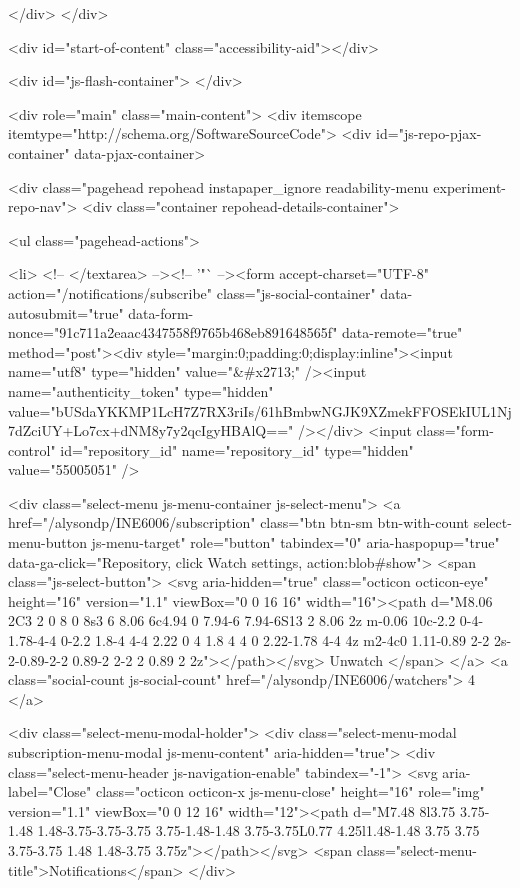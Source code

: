     
  </div>
</div>


      


    <div id="start-of-content" class="accessibility-aid"></div>

      <div id="js-flash-container">
</div>


    <div role="main" class="main-content">
        <div itemscope itemtype="http://schema.org/SoftwareSourceCode">
    <div id="js-repo-pjax-container" data-pjax-container>
      
<div class="pagehead repohead instapaper_ignore readability-menu experiment-repo-nav">
  <div class="container repohead-details-container">

    

<ul class="pagehead-actions">

  <li>
        <!-- </textarea> --><!-- '"` --><form accept-charset="UTF-8" action="/notifications/subscribe" class="js-social-container" data-autosubmit="true" data-form-nonce="91c711a2eaac4347558f9765b468eb891648565f" data-remote="true" method="post"><div style="margin:0;padding:0;display:inline"><input name="utf8" type="hidden" value="&#x2713;" /><input name="authenticity_token" type="hidden" value="bUSdaYKKMP1LcH7Z7RX3riIs/61hBmbwNGJK9XZmekFFOSEkIUL1Nj7dZciUY+Lo7cx+dNM8y7y2qcIgyHBAlQ==" /></div>      <input class="form-control" id="repository_id" name="repository_id" type="hidden" value="55005051" />

        <div class="select-menu js-menu-container js-select-menu">
          <a href="/alysondp/INE6006/subscription"
            class="btn btn-sm btn-with-count select-menu-button js-menu-target" role="button" tabindex="0" aria-haspopup="true"
            data-ga-click="Repository, click Watch settings, action:blob#show">
            <span class="js-select-button">
              <svg aria-hidden="true" class="octicon octicon-eye" height="16" version="1.1" viewBox="0 0 16 16" width="16"><path d="M8.06 2C3 2 0 8 0 8s3 6 8.06 6c4.94 0 7.94-6 7.94-6S13 2 8.06 2z m-0.06 10c-2.2 0-4-1.78-4-4 0-2.2 1.8-4 4-4 2.22 0 4 1.8 4 4 0 2.22-1.78 4-4 4z m2-4c0 1.11-0.89 2-2 2s-2-0.89-2-2 0.89-2 2-2 2 0.89 2 2z"></path></svg>
              Unwatch
            </span>
          </a>
          <a class="social-count js-social-count" href="/alysondp/INE6006/watchers">
            4
          </a>

        <div class="select-menu-modal-holder">
          <div class="select-menu-modal subscription-menu-modal js-menu-content" aria-hidden="true">
            <div class="select-menu-header js-navigation-enable" tabindex="-1">
              <svg aria-label="Close" class="octicon octicon-x js-menu-close" height="16" role="img" version="1.1" viewBox="0 0 12 16" width="12"><path d="M7.48 8l3.75 3.75-1.48 1.48-3.75-3.75-3.75 3.75-1.48-1.48 3.75-3.75L0.77 4.25l1.48-1.48 3.75 3.75 3.75-3.75 1.48 1.48-3.75 3.75z"></path></svg>
              <span class="select-menu-title">Notifications</span>
            </div>

